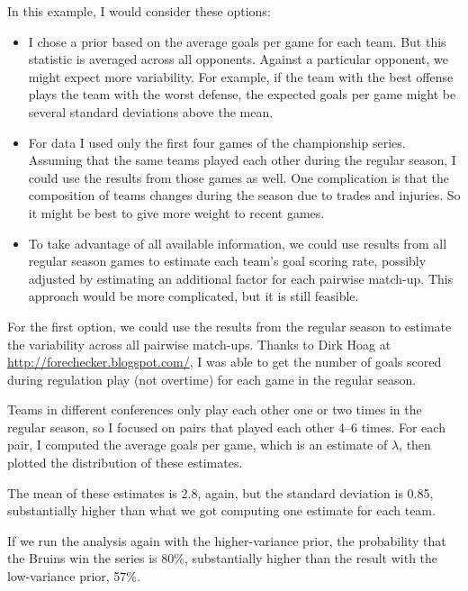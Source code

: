 \documentclass[12pt]{book}
\begin{document}
In this example, I would consider these options:

\begin{itemize}

\item I chose a prior based on the average goals per game for each
  team.  But this statistic is averaged across all opponents.  Against
  a particular opponent, we might expect more variability.  For
  example, if the team with the best offense plays the team with the
  worst defense, the expected goals per game might be several standard
  deviations above the mean.

\item For data I used only the first four games of the championship
  series.  Assuming that the same teams played each other during the
  regular season, I could use the results from those games as well.
  One complication is that the composition of teams changes during
  the season due to trades and injuries.  So it might be best to
  give more weight to recent games.

\item To take advantage of all available information, we could
  use results from all regular season games to estimate each team's
  goal scoring rate, possibly adjusted by estimating
  an additional factor for each pairwise match-up.  This approach
  would be more complicated, but it is still feasible.

\end{itemize}

For the first option, we could use the results from the regular season
to estimate the variability across all pairwise match-ups.  Thanks to
Dirk Hoag at \url{http://forechecker.blogspot.com/}, I was able to get
the number of goals scored during regulation play (not overtime) for
each game in the regular season.

Teams in different conferences only play each other one or two
times in the regular season, so I focused on pairs that played
each other 4--6 times.  For each pair, I computed the average
goals per game, which is an estimate of $\lambda$, then plotted
the distribution of these estimates.

The mean of these estimates is 2.8, again, but the standard
deviation is 0.85, substantially higher than what we got computing
one estimate for each team.

If we run the analysis again with the higher-variance prior, the
probability that the Bruins win the series is 80\%, substantially
higher than the result with the low-variance prior, 57\%.
\end{document}
